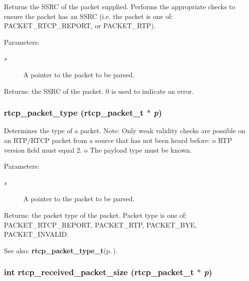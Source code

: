 Returns the SSRC of the packet supplied. Performs the appropriate checks to ensure the packet has an SSRC (i.e. the packet is one of: PACKET\_\-RTCP\_\-REPORT, or PACKET\_\-RTP). \begin{Desc}
\item[Parameters:]
\begin{description}
\item[{\em s}]A pointer to the packet to be parsed. \end{description}
\end{Desc}
\begin{Desc}
\item[Returns:]the SSRC of the packet. 0 is used to indicate an error. \end{Desc}
\subsubsection{ rtcp\_\-packet\_\-type ({\bf rtcp\_\-packet\_\-t} $\ast$ {\em p})}\label{rtcp_8c_a24}


Determines the type of a packet. Note: Only weak validity checks are possible on an RTP/RTCP packet from a source that has not been heard before: o RTP version field must equal 2. o The payload type must be known. \begin{Desc}
\item[Parameters:]
\begin{description}
\item[{\em s}]A pointer to the packet to be parsed. \end{description}
\end{Desc}
\begin{Desc}
\item[Returns:]the packet type of the packet. Packet type is one of: PACKET\_\-RTCP\_\-REPORT, PACKET\_\-RTP, PACKET\_\-BYE, PACKET\_\-INVALID. \end{Desc}
\begin{Desc}
\item[See also:]{\bf rtcp\_\-packet\_\-type\_\-t}{\rm (p.\,\pageref{rtp_8h_a35})}. \end{Desc}
\subsubsection{\setlength{\rightskip}{0pt plus 5cm}int rtcp\_\-received\_\-packet\_\-size ({\bf rtcp\_\-packet\_\-t} $\ast$ {\em p})\hspace{0.3cm}{\tt  [static]}}\label{rtcp_8c_a18}


